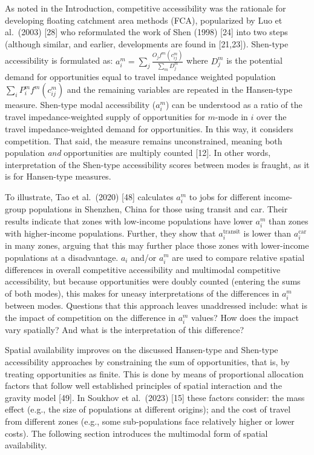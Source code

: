 \documentclass[10pt,letterpaper]{article}
\begin{document}
As noted in the Introduction, competitive accessibility was the
rationale for developing floating catchment area methods (FCA),
popularized by Luo et al.~(2003) {[}28{]} who reformulated the work of
Shen (1998) {[}24{]} into two steps (although similar, and earlier,
developments are found in {[}21,23{]}). Shen-type accessibility is
formulated as: \(a_i^m = \sum_j \frac{O_jf^m(c_{ij}^m)}{\sum_m D_j^m}\)
where \(D_j^m\) is the potential demand for opportunities equal to
travel impedance weighted population \(\sum_i P_i^m f^m(c_{ij}^m)\) and
the remaining variables are repeated in the Hansen-type measure.
Shen-type modal accessibility (\(a_i^m\)) can be understood as a ratio
of the travel impedance-weighted supply of opportunities for \(m\)-mode
in \(i\) over the travel impedance-weighted demand for opportunities. In
this way, it considers competition. That said, the measure remains
unconstrained, meaning both population \emph{and} opportunities are
multiply counted {[}12{]}. In other words, interpretation of the
Shen-type accessibility scores between modes is fraught, as it is for
Hansen-type measures.

To illustrate, Tao et al.~(2020) {[}48{]} calculates \(a_i^m\) to jobs
for different income-group populations in Shenzhen, China for those
using transit and car. Their results indicate that zones with low-income
populations have lower \(a_i^m\) than zones with higher-income
populations. Further, they show that \(a_i^{\text{transit}}\) is lower
than \(a_i^{\text{car}}\) in many zones, arguing that this may further
place those zones with lower-income populations at a disadvantage.
\(a_i\) and/or \(a_i^m\) are used to compare relative spatial
differences in overall competitive accessibility and multimodal
competitive accessibility, but because opportunities were doubly counted
(entering the sums of both modes), this makes for uneasy interpretations
of the differences in \(a_i^{m}\) between modes. Questions that this
approach leaves unaddressed include: what is the impact of competition
on the difference in \(a_i^m\) values? How does the impact vary
spatially? And what is the interpretation of this difference?

Spatial availability improves on the discussed Hansen-type and Shen-type
accessibility approaches by constraining the sum of opportunities, that
is, by treating opportunities as finite. This is done by means of
proportional allocation factors that follow well established principles
of spatial interaction and the gravity model {[}49{]}. In Soukhov et
al.~(2023) {[}15{]} these factors consider: the mass effect (e.g., the
size of populations at different origins); and the cost of travel from
different zones (e.g., some sub-populations face relatively higher or
lower costs). The following section introduces the multimodal form of
spatial availability.
\end{document}
